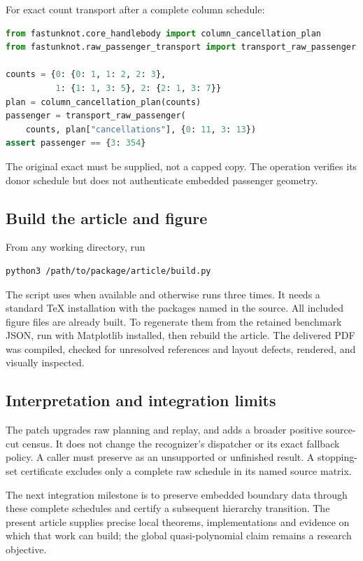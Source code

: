 For exact count transport after a complete column schedule:
\begin{lstlisting}[language=Python]
from fastunknot.core_handlebody import column_cancellation_plan
from fastunknot.raw_passenger_transport import transport_raw_passenger

counts = {0: {0: 1, 1: 2, 2: 3},
          1: {1: 1, 3: 5}, 2: {2: 1, 3: 7}}
plan = column_cancellation_plan(counts)
passenger = transport_raw_passenger(
    counts, plan["cancellations"], {0: 11, 3: 13})
assert passenger == {3: 354}
\end{lstlisting}
The original exact  must be supplied, not a capped copy.
The operation verifies its donor schedule but does not authenticate
embedded passenger geometry.

\subsection{Build the article and figure}

From any working directory, run
\begin{lstlisting}
python3 /path/to/package/article/build.py
\end{lstlisting}
The script uses  when available and otherwise runs
 three times. It needs a standard TeX installation with
the packages named in the source. All included figure files are already
built. To regenerate them from the retained benchmark JSON, run
 with Matplotlib installed, then rebuild
the article. The delivered PDF was compiled, checked for unresolved
references and layout defects, rendered, and visually inspected.

\subsection{Interpretation and integration limits}

The patch upgrades raw planning and replay, and adds a broader positive
source-cut census. It does not change the recognizer's dispatcher or
its exact fallback policy. A caller must preserve 
as an unsupported or unfinished result. A stopping-set certificate
excludes only a complete raw schedule in its named source matrix.

The next integration milestone is to preserve embedded boundary data
through these complete schedules and certify a subsequent hierarchy
transition. The present article supplies precise local theorems,
implementations and evidence on which that work can build; the global
quasi-polynomial claim remains a research objective.
